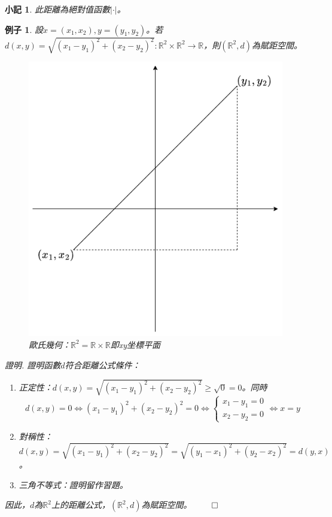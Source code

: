 \documentclass[12pt]{article}
\newtheorem*{remark}{小記}
\newtheorem*{example}{例子}
\renewenvironment*{proof}{\textit{證明.}}{\hfill$\qed$}
\begin{document}
    \begin{remark}
        此距離為絕對值函數$|\cdot|$。
    \end{remark}

    \begin{example}
        設$x=(x_1,x_2),y=(y_1,y_2)$。若$d(x,y)=\sqrt{(x_1-y_1)^2+(x_2-y_2)^2}:\mathbb{R}^2\times\mathbb{R}^2\to \mathbb{R}$，則$(\mathbb{R}^2,d)$為賦距空間。
        \begin{figure}[H]
            \centering
            \includegraphics[scale=0.6]{EuclideanDistance.png}
            \caption{歐氏幾何：$\mathbb{R}^2=\mathbb{R}\times\mathbb{R}$即xy坐標平面}
        \end{figure}

        \begin{proof}
            證明函數$d$符合距離公式條件：
            \begin{enumerate}
                \item 正定性：$d(x,y)=\sqrt{(x_1-y_1)^2+(x_2-y_2)^2}\geq \sqrt{0}=0$。同時$$d(x,y)=0\iff (x_1-y_1)^2+(x_2-y_2)^2=0\iff \begin{cases}
                    x_1-y_1=0\\
                    x_2-y_2=0
                \end{cases}\iff x=y$$
                \item 對稱性：$d(x,y)=\sqrt{(x_1-y_1)^2+(x_2-y_2)^2}=\sqrt{(y_1-x_1)^2+(y_2-x_2)^2}=d(y,x)$。
                \item 三角不等式：證明留作習題。
            \end{enumerate}
            因此，$d$為$\mathbb{R}^2$上的距離公式，$(\mathbb{R}^2,d)$為賦距空間。
        \end{proof}
    \end{example}
\end{document}
